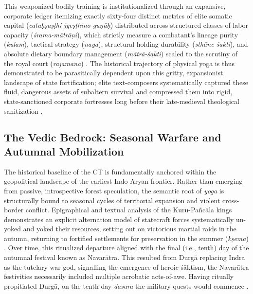 \documentclass[11pt,twoside,letterpaper]{article}
\begin{document}
This weaponized bodily training is institutionalized through an expansive, corporate ledger itemizing exactly sixty-four distinct metrics of elite somatic capital (\textit{catuḥṣaṣṭhi jyeṣṭhino guṇāḥ}) distributed across structured classes of labor capacity (\textit{śrama-mātrāṇi}), which strictly measure a combatant's lineage purity (\textit{kulam}), tactical strategy (\textit{naya}), structural holding durability (\textit{sthāne śakti}), and absolute dietary boundary management (\textit{mātrā-śakti}) scaled to the scrutiny of the royal court (\textit{rājamāna}) \citep{MP_7, Olivelle2011}. The historical trajectory of physical yoga is thus demonstrated to be parasitically dependent upon this gritty, expansionist landscape of state fortification; elite text-composers systematically captured these fluid, dangerous assets of subaltern survival and compressed them into rigid, state-sanctioned corporate fortresses long before their late-medieval theological sanitization \citep{MP_7, kolff1971, kolff1990}.

\subsection{The Vedic Bedrock: Seasonal Warfare and Autumnal Mobilization}
The historical baseline of the CT is fundamentally anchored within the geopolitical landscape of the earliest Indo-Aryan frontier. Rather than emerging from passive, introspective forest speculation, the semantic root of \textit{yoga} is structurally bound to seasonal cycles of territorial expansion and violent cross-border conflict. Epigraphical and textual analysis of the Kuru-Pañcāla kings demonstrates an explicit alternation model of statecraft forces systematically un-yoked and yoked their resources, setting out on victorious martial raids in the autumn, returning to fortified settlements for preservation in the summer (\textit{kṣema}) \citep{oberlies2024, witzel1997, witzel2023}. Over time, this ritualized departure aligned with the final (i.e., tenth) day of the autumnal festival known as Navarātra. This resulted from Durgā replacing Indra as the tutelary war god, signalling the emergence of heroic śāktism, the Navarātra festivities necessarily included multiple acrobatic acts-of-awe. Having ritually propitiated Durgā, on the tenth day \textit{dasara} the military quests would commence \citep{suebsantiwongse2023, sarkar2020, sarkar2017}. 
\end{document}
